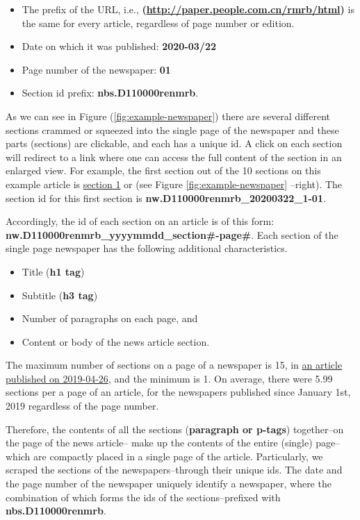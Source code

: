 \documentclass[
  12pt,
]{article}
\providecommand{\tightlist}{%
  \setlength{\itemsep}{0pt}\setlength{\parskip}{0pt}}
\begin{document}
\begin{itemize}
\item
  The prefix of the URL, i.e.,
  \textbf{(\url{http://paper.people.com.cn/rmrb/html})} is the same for every article, regardless of page number or edition.
\item
  Date on which it was published: \textbf{2020-03/22}
\item
  Page number of the newspaper: \textbf{01}
\item
  Section id prefix: \textbf{nbs.D110000renmrb}.
\end{itemize}

As we can see in Figure (\ref{fig:example-newspaper}) there are several different sections crammed or squeezed into the single page of the newspaper and these parts (sections) are clickable, and each has a unique id. A click on each section will redirect to a link where one can access the full content of the section in an enlarged view. For example, the first section out of the 10 sections on this example article is \href{http://paper.people.com.cn/rmrb/html/2020-03/22/nw.D110000renmrb_20200322_1-01.htm}{section 1} or (see Figure \ref{fig:example-newspaper} --right). The section id for this first section is \textbf{nw.D110000renmrb\_20200322\_1-01}.

Accordingly, the id of each section on an article is of this form: \textbf{nw.D110000renmrb\_yyyymmdd\_section\#-page\#}. Each section of the single page newspaper has the following additional characteristics.

\begin{itemize}
\tightlist
\item
  Title (\textbf{h1 tag})
\item
  Subtitle (\textbf{h3 tag})
\item
  Number of paragraphs on each page, and
\item
  Content or body of the news article section.
\end{itemize}

The maximum number of sections on a page of a newspaper is 15, in \href{http://paper.people.com.cn/rmrb/html/2019-04/26/nbs.D110000renmrb_01.htm}{an article published on 2019-04-26}, and the minimum is 1. On average, there were 5.99 sections per a page of an article, for the newspapers published since January 1st, 2019 regardless of the page number.

Therefore, the contents of all the sections (\textbf{paragraph or p-tags}) together--on the page of the news article-- make up the contents of the entire (single) page--which are compactly placed in a single page of the article. Particularly, we scraped the sections of the newspapers--through their unique ids. The date and the page number of the newspaper uniquely identify a newspaper, where the combination of which forms the ids of the sections--prefixed with \textbf{nbs.D110000renmrb}.
\end{document}
